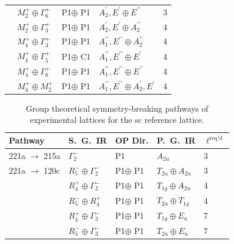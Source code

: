 \documentclass[preprint]{iucr}              %
\begin{document}
\begin{table}
\begin{tabular}{lllll}
& $M_2^+ \oplus \Gamma_6^+$ & P1$ \oplus$ P1  &  $A_2^\prime,E^\prime \oplus E^{\prime\prime}$ & 3 \\
& $M_2^+ \oplus \Gamma_3^+$ & P1$ \oplus$ P1 &  $A_2^\prime,E^\prime \oplus A_2^{\prime\prime}$ & 4 \\
& $M_4^+ \oplus \Gamma_3^+$ & P1$ \oplus$ P1 &   $A_1^{\prime\prime},E^{\prime\prime} \oplus A_2^{\prime\prime}$ & 4 \\
& $M_4^+ \oplus \Gamma_5^+$ & P1$ \oplus$ C1 &  $A_1^{\prime\prime},E^{\prime\prime} \oplus E^\prime$ & 4 \\
& $M_4^+ \oplus \Gamma_6^+$ & P1$ \oplus$ P1 &  $A_1^{\prime\prime},E^{\prime\prime} \oplus E^{\prime\prime}$ & 4 \\
& $M_4^+ \oplus M_2^+$  & P1$ \oplus$ P1 & $A_1^{\prime\prime},E^{\prime\prime} \oplus A_2^\prime,E^\prime$ & 4 \\
\hline
\end{tabular}
\end{table}

\begin{table}
\caption{Group theoretical symmetry-breaking pathways of
experimental lattices for the sc reference
lattice.}\label{pathwaysSC}%
\begin{tabular}{lllll}\hline
Pathway & S.~G.~IR & OP Dir. & P.~G.~IR & $\ell^{\mathrm{req'd}}$  \\
\hline
221a $\rightarrow$ 215a & $\Gamma_2^-$ & P1 & $A_{2u}$ & 3 \\
221a $\rightarrow$ 120c & $R_5^-\oplus \Gamma_2^-$ & P1$ \oplus$ P1 & $T_{2u} \oplus A_{2u}$  & 3 \\
& $R_4^+\oplus \Gamma_2^-$ & P1$ \oplus$ P1 & $T_{1g} \oplus A_{2u}$ & 4 \\
& $R_5^-\oplus R_4^+$ & P1$ \oplus$ P1 & $T_{2u} \oplus T_{1g}$  & 4 \\
& $R_4^+\oplus \Gamma_3^-$ & P1$ \oplus$ P1 & $T_{1g} \oplus E_u$  & 7 \\
& $R_5^-\oplus \Gamma_3^-$ & P1$ \oplus$ P1 & $T_{2u} \oplus E_u$  & 7 \\
\hline
\end{tabular}
\end{table}
\end{document}
